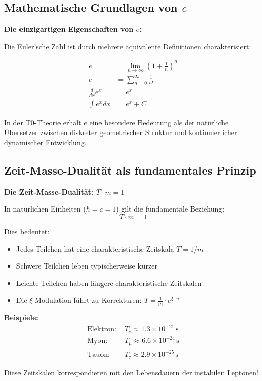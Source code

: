 \documentclass[12pt,a4paper]{article}
\newcommand{\xipar}{\xi}
\begin{document}
	\subsection{Mathematische Grundlagen von $e$}
	
	\begin{beziehung}
		\textbf{Die einzigartigen Eigenschaften von $e$:}
		
		Die Euler'sche Zahl ist durch mehrere äquivalente Definitionen charakterisiert:
		
		\begin{align}
			e &= \lim_{n \to \infty} \left(1 + \frac{1}{n}\right)^n \\
			e &= \sum_{n=0}^{\infty} \frac{1}{n!} \\
			\frac{d}{dx}e^x &= e^x \\
			\int e^x dx &= e^x + C
		\end{align}
		
		In der T0-Theorie erhält $e$ eine besondere Bedeutung als der natürliche Übersetzer zwischen diskreter geometrischer Struktur und kontinuierlicher dynamischer Entwicklung.
	\end{beziehung}
	
	\subsection{Zeit-Masse-Dualität als fundamentales Prinzip}
	
	\begin{erkenntnis}
		\textbf{Die Zeit-Masse-Dualität: $T \cdot m = 1$}
		
		In natürlichen Einheiten ($\hbar = c = 1$) gilt die fundamentale Beziehung:
		\begin{equation}
			\boxed{T \cdot m = 1}
		\end{equation}
		
		Dies bedeutet:
		\begin{itemize}
			\item Jedes Teilchen hat eine charakteristische Zeitskala $T = 1/m$
			\item Schwere Teilchen leben typischerweise kürzer
			\item Leichte Teilchen haben längere charakteristische Zeitskalen
			\item Die $\xi$-Modulation führt zu Korrekturen: $T = \frac{1}{m} \cdot e^{\xipar \cdot n}$
		\end{itemize}
		
		\textbf{Beispiele:}
		\begin{align}
			\text{Elektron: } & T_e \approx 1.3 \times 10^{-21}\, \text{s} \\
			\text{Myon: } & T_\mu \approx 6.6 \times 10^{-24}\, \text{s} \\
			\text{Tauon: } & T_\tau \approx 2.9 \times 10^{-25}\, \text{s}
		\end{align}
		
		Diese Zeitskalen korrespondieren mit den Lebensdauern der instabilen Leptonen!
	\end{erkenntnis}
	
\end{document}
